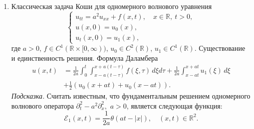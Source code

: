 \documentclass[unicode,12pt,draft]{article}
\begin{document}
\begin{enumerate}
\item
Классическая задача Коши для одномерного волнового уравнения
$$
    \left\{
        \begin{array}{l}
            u_{tt} = a^2 u_{xx} + f (x, t),
            \quad
            x \in {\mathbb R},
            \:
            t > 0,
            \\
            u (x, 0) = u_0 (x),
            \\
            u_t (x, 0) = u_1 (x),
        \end{array}
    \right.
$$
где $a > 0$, $f \in C^1 ({\mathbb R} \times [0, \infty))$, $u_0
\in C^2 ({\mathbb R})$, $u_1 \in C^1 ({\mathbb R})$.
Существование и единственность решения. Формула Даламбера
\begin{align*}
    u (x, t)
    &
    =
    \frac{1}{2 a}
    \int_0^t
    \int_{
        x - a (t - \tau)
    }^{
        x + a (t - \tau)
    }
    f (\xi, \tau)
    \,
    d\xi
    d\tau
    +
    \frac{1}{2 a}
    \int_{
        x - a t
    }^{
        x + a t
    }
    u_1 (\xi)
    \,
    d\xi
    \\
    &
    +
    \frac{1}{2}
    (
        u_0 (x + at)
        +
        u_0 (x - at)
    ).
    \nonumber
\end{align*}
{\it Подсказка.} Считать известным, что фундаментальным решением
одномерного волнового оператора $
    \partial_t^2 - a^2 \partial_x^2,
$ $a > 0$, является следующая функция:
$$
    {\mathcal E}_1 (x, t)
    =
    \frac{1}{2 a}
    \theta (a t - |x|),
    \quad
    (x, t)
    \in
    {\mathbb R}^2.
$$


\end{enumerate}
\end{document}
